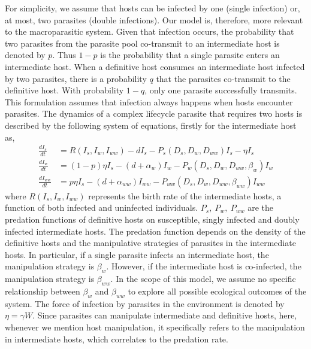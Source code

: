 \documentclass[a4paper]{scrartcl} %
\begin{document}
For simplicity, we assume that hosts can be infected by one (single infection) or, at most, two parasites (double infections). 
Our model is, therefore, more relevant to the macroparasitic system.
Given that infection occurs, the probability that two parasites from the parasite pool co-transmit to an intermediate host is denoted by  $p$. Thus $1-p$ is the probability that a single parasite enters an intermediate host. 
When a definitive host consumes an intermediate host infected by two parasites, there is a probability $q$ that the parasites co-transmit to the definitive host.
With probability $1-q$, only one parasite successfully transmits. 
This formulation assumes that infection always happens when hosts encounter parasites.
The dynamics of a complex lifecycle parasite that requires two hosts is described by the following system of equations, firstly for the intermediate host as,
%
\begin{align}
\frac{dI_s}{dt} &= R(I_s, I_w, I_{ww}) - d I_s - P_s(D_s, D_w, D_{ww}) I_s  - \eta  I_s \nonumber \\ 
\frac{dI_w}{dt} &=  (1 - p) \eta I_s  - (d + \alpha_w) I_w - P_w(D_s, D_w, D_{ww}, \beta_w) I_w \label{odes:ihosts} \\
\frac{dI_{ww}}{dt} &= p \eta I_s  - (d + \alpha_{ww}) I_{ww} - P_{ww}(D_s, D_w, D_{ww}, \beta_{ww}) I_{ww} \nonumber
\end{align}
%
where $R(I_s, I_w, I_{ww})$ represents the birth rate of the intermediate hosts, a function of both infected and uninfected individuals.
$P_s, \ P_w, \ P_{ww}$ are the predation functions of definitive hosts on susceptible, singly infected and doubly infected intermediate hosts. 
The predation function depends on the density of the definitive hosts and the manipulative strategies of parasites in the intermediate hosts. 
In particular, if a single parasite infects an intermediate host, the manipulation strategy is $\beta_w$. 
However, if the intermediate host is co-infected, the manipulation strategy is $\beta_{ww}$. 
In the scope of this model, we assume no specific relationship between $\beta_w$ and $\beta_{ww}$ to explore all possible ecological outcomes of the system. 
The force of infection by parasites in the environment is denoted by $\eta = \gamma W$. 
Since parasites can manipulate intermediate and definitive hosts, here, whenever we mention host manipulation, it specifically refers to the manipulation in intermediate hosts, which correlates to the predation rate.
\end{document}
